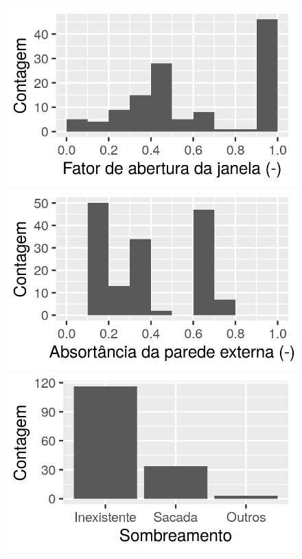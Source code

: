 \documentclass[brazil,hardcopy,openany]{ufscthesis} %
\begin{document}
\begin{figure}[H]
\begin{minipage}{.33\textwidth}
	\end{minipage}
	\centering	
	\begin{minipage}{.33\textwidth}
		\centering
		\includegraphics[width=\linewidth]{img/hist_openfac.png}
	\end{minipage}%
	\begin{minipage}{.33\textwidth}
		\centering
		\includegraphics[width=\linewidth]{img/hist_absortancia.png}
	\end{minipage}%
	\begin{minipage}{.33\textwidth}
		\centering
		\includegraphics[width=\linewidth]{img/hist_sombreamento.png}

\end{minipage}
\end{figure}
\end{document}
